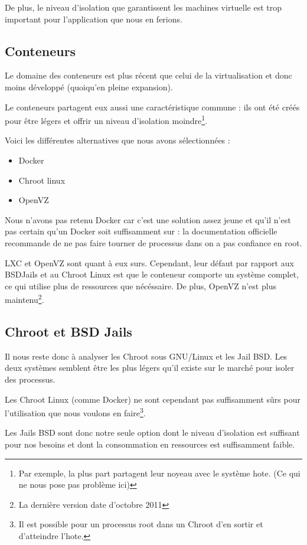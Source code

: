 \documentclass[10pt,a4paper]{article}
\begin{document}
De plus, le niveau d'isolation que garantissent les machines virtuelle est trop important pour l'application que nous en ferions.

\subsection{Conteneurs}
Le domaine des conteneurs est plus récent que celui de la virtualisation et donc moins développé (quoiqu'en pleine expansion).

Le conteneurs partagent eux aussi une caractéristique commune : ils ont été créés pour être légers et offrir un niveau d'isolation moindre\footnote{Par exemple, la plus part partagent leur noyeau avec le système hote. (Ce qui ne nous pose pas problème ici)}.

Voici les différentes alternatives que nous avons sélectionnées :

\begin{itemize}
    \item{Docker}
    \item{Chroot linux}
    \item{OpenVZ}
\end{itemize}

Nous n'avons pas retenu Docker car c'est une solution assez jeune et qu'il n'est pas certain qu'un Docker soit suffisamment sur : la documentation officielle recommande de ne pas faire tourner de processus dans on a pas confiance en root.

LXC et OpenVZ sont quant à eux surs.
Cependant, leur défaut par rapport aux BSDJails et au Chroot Linux est que le conteneur comporte un système complet, ce qui utilise plus de ressources que nécéssaire.
De plus, OpenVZ n'est plus maintenu\footnote{La dernière version date d'octobre 2011}.

\subsection{Chroot et BSD Jails}

Il nous reste donc à analyser les Chroot sous GNU/Linux et les Jail BSD.
Les deux systèmes semblent être les plus légers qu'il existe sur le marché pour isoler des processus.

Les Chroot Linux (comme Docker) ne sont cependant pas suffisamment sûrs pour l'utilisation que nous voulons en faire\footnote{Il est possible pour un processus root dans un Chroot d'en sortir et d'atteindre l'hote.}.

Les Jails BSD sont donc notre seule option dont le niveau d'isolation est suffisant pour nos besoins et dont la consommation en ressources est suffisamment faible.
\end{document}
